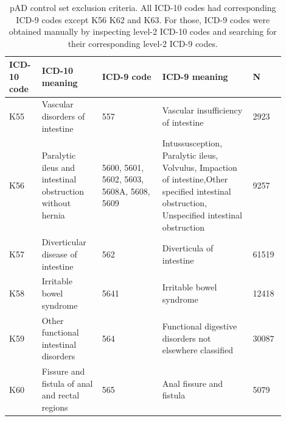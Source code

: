 \begin{table}[]
  \caption{pAD control set exclusion criteria. All ICD-10 codes had corresponding ICD-9 codes except K56 K62 and K63. For those, ICD-9 codes were obtained manually by inspecting level-2 ICD-10 codes and searching for their corresponding level-2 ICD-9 codes.}
  \label{table:ukbb_ctrl_excl_criteria}
  \begin{tabular}{|p{0.1\linewidth}|p{0.2\linewidth}|p{0.2\linewidth}|p{0.3\linewidth}|p{0.1\linewidth}|}
  \hline
  ICD-10 code & ICD-10 meaning                                            & ICD-9 code                          & ICD-9 meaning     & N                                                                                                                                                          \\ \hline
  K55         & Vascular disorders of intestine                           & 557                                 & Vascular insufficiency of intestine       & 2923                                                                                                                                  \\ \hline
  K56         & Paralytic ileus and intestinal obstruction without hernia & 5600, 5601, 5602, 5603, 5608A, 5608, 5609 & Intussusception, Paralytic ileus, Volvulus, Impaction of intestine,Other specified intestinal obstruction, Unspecified intestinal obstruction & 9257                              \\ \hline
  K57         & Diverticular disease of intestine                         & 562                                 & Diverticula of intestine              &     61519                                                                                                                                  \\ \hline
  K58         & Irritable bowel syndrome                                  & 5641                                & Irritable bowel syndrome          & 12418                                                                                                                                          \\ \hline
  K59         & Other functional intestinal disorders                     & 564                                 & Functional digestive disorders not elsewhere classified      & 30087                                                                                                               \\ \hline
  K60         & Fissure and fistula of anal and rectal regions            & 565                                 & Anal fissure and fistula     & 5079                                                                                                                                               \\ \hline

\end{tabular}
\end{table}
